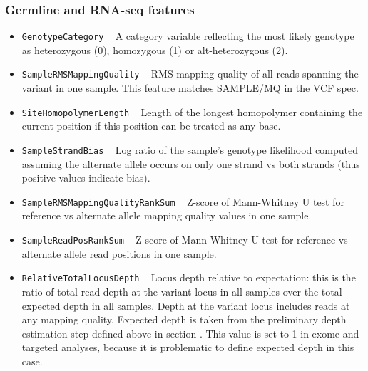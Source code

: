 \documentclass{article}
\begin{document}
\subsubsection{Germline and RNA-seq features}
\begin{itemize}

    \item \texttt{GenotypeCategory} ~ A category variable reflecting the most likely genotype as heterozygous (0), homozygous (1) or alt-heterozygous (2).

    \item \texttt{SampleRMSMappingQuality} ~ RMS mapping quality of all reads spanning the variant in one sample. This feature matches SAMPLE/MQ in the VCF spec.

    \item \texttt{SiteHomopolymerLength} ~ Length of the longest homopolymer containing the current position if this position can be treated as any base.

    \item \texttt{SampleStrandBias} ~ Log ratio of the sample's genotype likelihood computed assuming the alternate allele occurs on only one strand vs both strands (thus positive values indicate bias). %

    \item \texttt{SampleRMSMappingQualityRankSum} ~ Z-score of Mann-Whitney U test for reference vs alternate allele mapping quality values in one sample.

    \item \texttt{SampleReadPosRankSum} ~ Z-score of Mann-Whitney U test for reference vs alternate allele read positions in one sample.

    \item \texttt{RelativeTotalLocusDepth} ~ Locus depth relative to expectation: this is the ratio of total read depth at the variant locus in all samples over the total expected depth in all samples. Depth at the variant locus includes reads at any mapping quality. Expected depth is taken from the preliminary depth estimation step defined above in section . This value is set to 1 in exome and targeted analyses, because it is problematic to define expected depth in this case.


\end{itemize}
\end{document}
